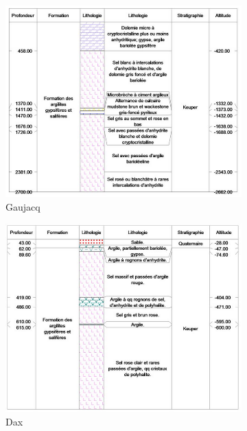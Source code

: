 \documentclass[11pt,french,a4paper]{article}
\begin{document}
\begin{figure}
     \centering
     \begin{subfigure}[b]{0.48\textwidth}
         \centering
         \includegraphics[width=\textwidth]{image/annexe/chap4/salines/gaujacq.png}
         \caption{Gaujacq}
     \end{subfigure}
     \begin{subfigure}[b]{0.48\textwidth}
         \centering
         \includegraphics[width=\textwidth]{image/annexe/chap4/salines/dax.png}
         \caption{Dax}
     \end{subfigure}
     \begin{subfigure}[b]{0.48\textwidth}

\end{subfigure}
\end{figure}
\end{document}
